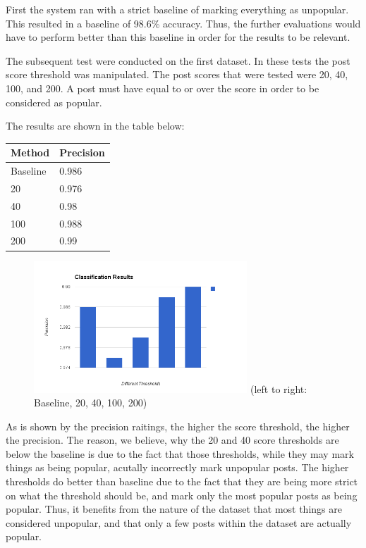 \documentclass{acm_proc_article-sp}
\begin{document}
First the system ran with a strict baseline of marking everything as unpopular. This resulted in a baseline of 98.6\% accuracy. Thus, the further evaluations would have to perform better than this baseline in order for the results to be relevant.

The subsequent test were conducted on the first dataset. In these tests the post score threshold was manipulated. The post scores that were tested were 20, 40, 100, and 200. A post must have equal to or over the score in order to be considered as popular. 

The results are shown in the table below:\\
\begin{tabular}{l|l}
Method & Precision\\
\hline
Baseline & 0.986\\
20 & 0.976\\
40 & 0.98\\
100 & 0.988\\
200 & 0.99\\
\end{tabular}

\begin{figure}[h!]
\includegraphics[width=8cm]{dataset-keyword.png}
(left to right: Baseline, 20, 40, 100, 200)
\end{figure}

As is shown by the precision raitings, the higher the score threshold, the higher the precision. The reason, we believe, why the 20 and 40 score thresholds are below the baseline is due to the fact that those thresholds, while they may mark things as being popular, acutally incorrectly mark unpopular posts. The higher thresholds do better than baseline due to the fact that they are being more strict on what the threshold should be, and mark only the most popular posts as being popular. Thus, it benefits from the nature of the dataset that most things are considered unpopular, and that only a few posts within the dataset are actually popular.
\end{document}
